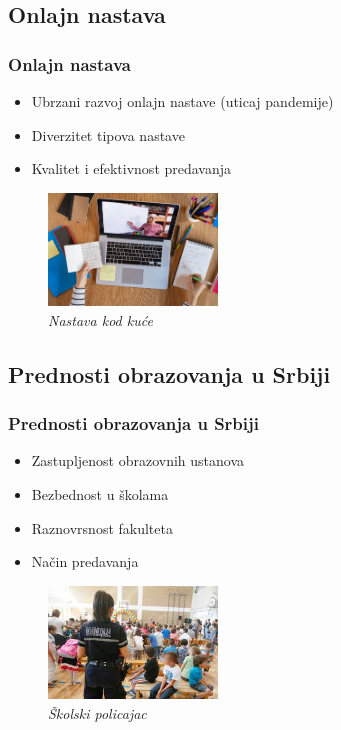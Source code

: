 \documentclass{beamer}
\begin{document}
\subsection{Onlajn nastava}

\begin{frame}[fragile]\frametitle{Onlajn nastava}
	\begin{itemize}	
		\item Ubrzani razvoj onlajn nastave (uticaj pandemije)
		\item Diverzitet tipova nastave
        \item Kvalitet i efektivnost predavanja
		
	\end{itemize}
   \begin{figure}[h!]
        \centering\includegraphics[height=3cm]{online1.jpg} 
        \caption{\emph{ Nastava kod kuće}}
        \label{fig:onlajn_nastava}
\end{figure}
\end{frame}


\subsection{Prednosti obrazovanja u Srbiji}
\begin{frame}[fragile]\frametitle{Prednosti obrazovanja u Srbiji}
\begin{itemize}
    \item Zastupljenost obrazovnih ustanova
    \item Bezbednost u školama
    \item Raznovrsnost fakulteta
    \item Način predavanja
\end{itemize}
\begin{figure}[h!]
        \centering\includegraphics[height=3cm]{skolski_policajac.jpg} 
        \caption{\emph{ Školski policajac}}
        \label{fig:Bezbednost}
\end{figure}
\end{frame}
\end{document}
